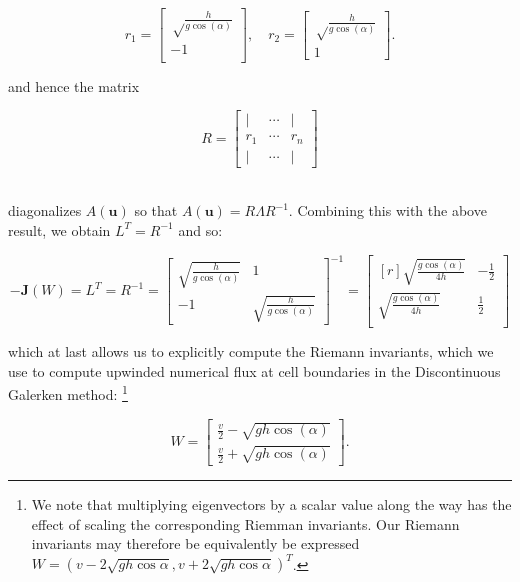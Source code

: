 $$
r_1 = \begin{bmatrix}
    \sqrt\frac{h}{g \cos{(\alpha)}} \\
    -1 \\
\end{bmatrix}, \quad r_2 = \begin{bmatrix}
    \sqrt\frac{h}{g \cos{(\alpha)}} \\
    1
\end{bmatrix}.
$$

\noindent and hence the matrix 

$$
R = \begin{bmatrix}
    \vert & \cdots & \vert \\
    r_1   & \cdots & r_n   \\
    \vert & \cdots & \vert
\end{bmatrix}
$$

\ \\
\noindent diagonalizes $A(\textbf{u})$ so that $A(\textbf{u}) = R \Lambda R^{-1}$. Combining this with the above result,
we obtain $L^T = R^{-1}$ and so:

\[\renewcommand\arraystretch{2}
-\textbf{J}(W) = L^T = R^{-1} = \begin{bmatrix}
    \sqrt{\frac{h}{g \cos{(\alpha)}}} & 1 \\
    -1                                & \sqrt{\frac{h}{g \cos{(\alpha)}}}
\end{bmatrix}^{-1} = \begin{bmatrix*}[r]
    \sqrt{\frac{g \cos{(\alpha)}}{4h}} & -\frac{1}{2} \\
    \sqrt{\frac{g \cos{(\alpha)}}{4h}} &  \frac{1}{2} \\
\end{bmatrix*}
\]

\noindent which at last allows us to explicitly compute the Riemann invariants, which we use to compute upwinded 
numerical flux at cell boundaries in the Discontinuous Galerken method: \footnote{
    We note that multiplying eigenvectors by a scalar value along the way has the effect of scaling the corresponding 
    Riemman invariants. Our Riemann invariants may therefore be equivalently be expressed \linebreak
    $W = (v - 2 \sqrt{gh \cos{\alpha}}, v + 2 \sqrt{gh \cos{\alpha}})^T$.
}

\[\renewcommand\arraystretch{2}
W = \begin{bmatrix}
    \frac{v}{2} - \sqrt{g h \cos{(\alpha)}} \\ 
    \frac{v}{2} + \sqrt{g h \cos{(\alpha)}} 
\end{bmatrix}.
\]
